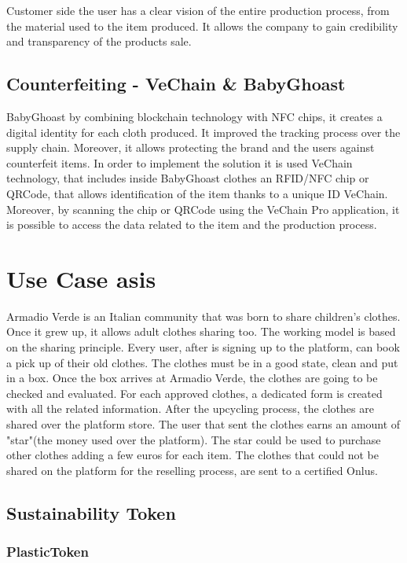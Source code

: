 Customer side the user has a clear vision of the entire production process, from the material used to the 
item produced. It allows the company to gain credibility and transparency of the products sale. 

\subsection{Counterfeiting - VeChain & BabyGhoast}

BabyGhoast by combining blockchain technology with NFC chips, it creates a digital identity for each cloth 
produced. It improved the tracking process over the supply chain. Moreover, it allows protecting the brand 
and the users against counterfeit items. In order to implement the solution it is used VeChain technology, that includes 
inside BabyGhoast clothes an RFID/NFC chip or QRCode, that allows identification of the item thanks to a 
unique ID VeChain. Moreover, by scanning the chip or QRCode using the VeChain Pro application, it is possible to 
access the data related to the item and the production process. 

\section{Use Case asis}

Armadio Verde is an Italian community that was born to share children's clothes. Once it grew up, it allows 
adult clothes sharing too. The working model is based on the sharing principle. Every user, after is signing up 
to the platform, can book a pick up of their old clothes. The clothes must be in a good state, clean and 
put in a box. Once the box arrives at Armadio Verde, the clothes are going to be checked and evaluated. For each 
approved clothes, a dedicated form  is created with all the related information. After the upcycling process, 
the clothes are shared over the platform store. The user that sent the clothes earns an amount of 
"star"(the money used over the platform). The star could be used to purchase other clothes adding a few euros 
for each item. The clothes that could not be shared on the platform for the reselling process, are sent to a 
certified Onlus.

\subsection{Sustainability Token}

\subsubsection{PlasticToken}

